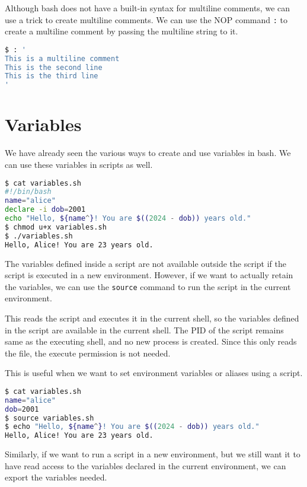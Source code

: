 Although bash does not have a built-in syntax for multiline comments, we can use a trick to create multiline comments.
We can use the NOP command \lstinline{:} to create a multiline comment by passing the multiline string to it.

\begin{lstlisting}[language=bash]
$ : '
This is a multiline comment
This is the second line
This is the third line
'
\end{lstlisting}

\section{Variables}

We have already seen the various ways to create and use variables in bash. We can use these variables in scripts as well.

\begin{lstlisting}[language=bash]
$ cat variables.sh
#!/bin/bash
name="alice"
declare -i dob=2001
echo "Hello, ${name^}! You are $((2024 - dob)) years old."
$ chmod u+x variables.sh
$ ./variables.sh
Hello, Alice! You are 23 years old.
\end{lstlisting}

The variables defined inside a script are not available outside the script if the script is executed in a new environment.
However, if we want to actually retain the variables, we can use the \lstinline{source} command to run the script in the current environment.

This reads the script and executes it in the current shell, so the variables defined in the script are available in the current shell. The PID of the script remains same as the executing shell, and no new process is created.
Since this only reads the file, the execute permission is not needed.

This is useful when we want to set environment variables or aliases using a script.

\begin{lstlisting}[language=bash]
$ cat variables.sh
name="alice"
dob=2001
$ source variables.sh
$ echo "Hello, ${name^}! You are $((2024 - dob)) years old."
Hello, Alice! You are 23 years old.
\end{lstlisting}

Similarly, if we want to run a script in a new environment, but we still want it to have read access to the variables declared in the current environment, we can export the variables needed.

